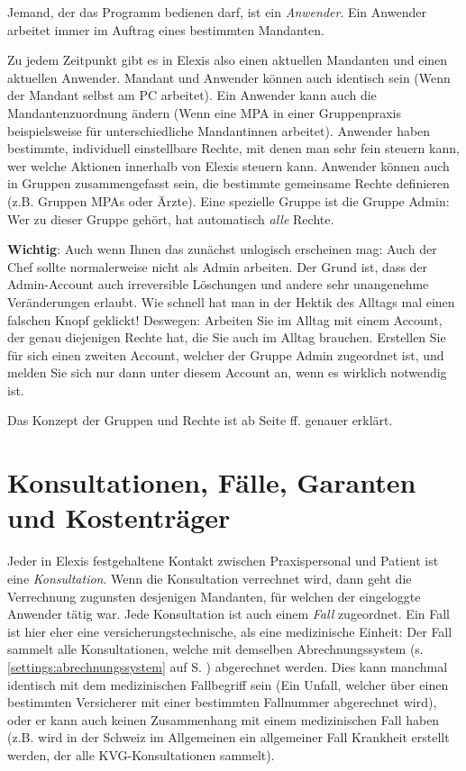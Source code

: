 \medskip

Jemand, der das Programm bedienen darf, ist ein \textit{Anwender}. Ein Anwender arbeitet immer im Auftrag eines bestimmten Mandanten.

Zu jedem Zeitpunkt gibt es in Elexis also einen aktuellen Mandanten und einen aktuellen Anwender.
Mandant und Anwender können auch identisch sein (Wenn der
Mandant selbst am PC arbeitet).
Ein Anwender kann auch die Mandantenzuordnung ändern (Wenn eine MPA in einer Gruppenpraxis beispielsweise für unterschiedliche
Mandantinnen arbeitet).
Anwender haben bestimmte, individuell einstellbare Rechte, mit denen man sehr
fein steuern kann, wer welche Aktionen innerhalb von Elexis steuern kann.
Anwender können auch in Gruppen zusammengefasst sein, die bestimmte gemeinsame
Rechte definieren (z.B. Gruppen \glqq MPAs\grqq{} oder \glqq Ärzte\grqq{}). Eine
spezielle Gruppe ist die Gruppe \glqq Admin\grqq{}: Wer zu dieser Gruppe gehört,
hat automatisch \textit{alle} Rechte.

\medskip

\textbf{Wichtig}: Auch wenn Ihnen das zunächst unlogisch erscheinen mag: Auch
der Chef sollte normalerweise nicht als Admin  arbeiten.
Der Grund ist, dass der Admin-Account auch irreversible Löschungen und andere
sehr unangenehme Veränderungen erlaubt. Wie schnell hat man in der Hektik des
Alltags mal einen falschen Knopf geklickt!
Deswegen: Arbeiten Sie im Alltag mit einem Account, der genau diejenigen Rechte
hat, die Sie auch im Alltag brauchen. Erstellen Sie für sich einen zweiten
Account, welcher der Gruppe Admin zugeordnet ist, und melden Sie sich nur dann
unter diesem Account an, wenn es wirklich notwendig ist.

Das Konzept der Gruppen und Rechte ist ab Seite \pageref{sec:gruppen} ff.
genauer erklärt.

\section{Konsultationen, Fälle, Garanten und Kostenträger}
Jeder in Elexis festgehaltene Kontakt zwischen Praxispersonal und Patient ist eine \textit{Konsultation}. Wenn die Konsultation verrechnet wird, dann geht die Verrechnung zugunsten desjenigen Mandanten, für welchen der eingeloggte Anwender tätig war.
\label{definition:fall}
Jede Konsultation ist auch einem \textit{Fall} zugeordnet. Ein Fall ist hier eher eine versicherungstechnische, als eine medizinische Einheit: Der Fall sammelt alle Konsultationen, welche mit demselben Abrechnungssystem (s. \ref{settings:abrechnungssystem} auf S. \pageref{settings:abrechnungssystem}) abgerechnet werden. Dies kann manchmal identisch mit dem medizinischen Fallbegriff sein (Ein Unfall, welcher über einen bestimmten Versicherer mit einer bestimmten Fallnummer abgerechnet wird), oder er kann auch keinen Zusammenhang mit einem medizinischen Fall haben (z.B. wird in der Schweiz im Allgemeinen ein allgemeiner Fall \glqq Krankheit\grqq{} erstellt werden, der alle KVG-Konsultationen sammelt).

